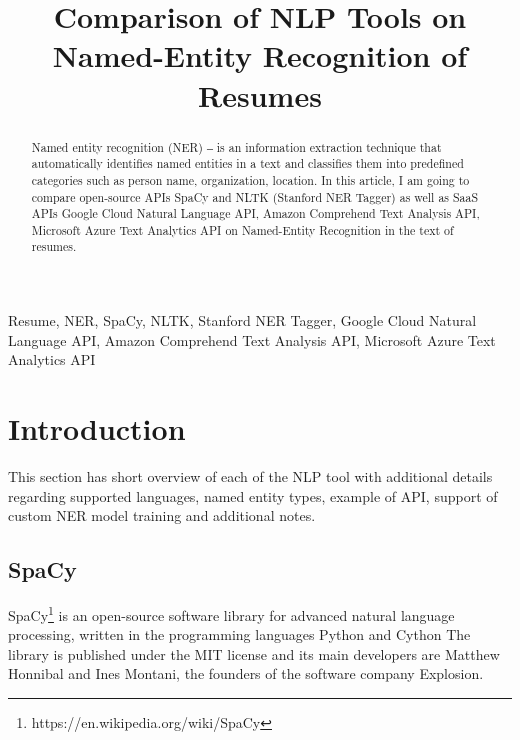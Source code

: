 \documentclass[conference]{IEEEtran}
\begin{document}
\title{Comparison of NLP Tools on Named-Entity Recognition of Resumes}

\author{
}

\maketitle

\begin{abstract}
Named entity recognition (NER) ‒ is an information extraction technique that automatically identifies named entities in a text and classifies them into predefined categories such as person name, organization, location. In this article, I am going to compare open-source APIs SpaCy and NLTK (Stanford NER Tagger) as well as SaaS APIs Google Cloud Natural Language API, Amazon Comprehend Text Analysis API, Microsoft Azure Text Analytics API on Named-Entity Recognition in the text of resumes.\end{abstract}

\begin{IEEEkeywords}
Resume, NER, SpaCy, NLTK, Stanford NER Tagger, Google Cloud Natural Language API, Amazon Comprehend Text Analysis API, Microsoft Azure Text Analytics API 
\end{IEEEkeywords}

\section{Introduction}
This section has short overview of each of the NLP tool with additional details regarding supported languages, named entity types, example of API, support of custom NER model training and additional notes.

\subsection{SpaCy}

SpaCy\footnote{https://en.wikipedia.org/wiki/SpaCy} is an open-source software library for advanced natural language processing, written in the programming languages Python and Cython The library is published under the MIT license and its main developers are Matthew Honnibal and Ines Montani, the founders of the software company Explosion.
\end{document}
